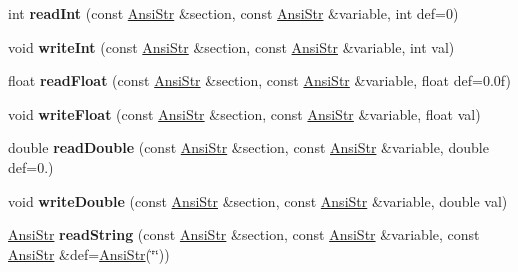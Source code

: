 \begin{DoxyCompactItemize}
\item 
\hypertarget{classps_1_1utils_1_1IniFile_a3eb09c6424b2f1d82fe7008445838fed}{}int {\bfseries read\+Int} (const \hyperlink{classps_1_1base_1_1CAString}{Ansi\+Str} \&section, const \hyperlink{classps_1_1base_1_1CAString}{Ansi\+Str} \&variable, int def=0)\label{classps_1_1utils_1_1IniFile_a3eb09c6424b2f1d82fe7008445838fed}

\item 
\hypertarget{classps_1_1utils_1_1IniFile_a0ebbcfb0c2053b526665893902dfbdc9}{}void {\bfseries write\+Int} (const \hyperlink{classps_1_1base_1_1CAString}{Ansi\+Str} \&section, const \hyperlink{classps_1_1base_1_1CAString}{Ansi\+Str} \&variable, int val)\label{classps_1_1utils_1_1IniFile_a0ebbcfb0c2053b526665893902dfbdc9}

\item 
\hypertarget{classps_1_1utils_1_1IniFile_a5d06bd9d2c705cf333fb9fc5af9f1e04}{}float {\bfseries read\+Float} (const \hyperlink{classps_1_1base_1_1CAString}{Ansi\+Str} \&section, const \hyperlink{classps_1_1base_1_1CAString}{Ansi\+Str} \&variable, float def=0.\+0f)\label{classps_1_1utils_1_1IniFile_a5d06bd9d2c705cf333fb9fc5af9f1e04}

\item 
\hypertarget{classps_1_1utils_1_1IniFile_a5eca8b88c79d70495281dde32a286eb4}{}void {\bfseries write\+Float} (const \hyperlink{classps_1_1base_1_1CAString}{Ansi\+Str} \&section, const \hyperlink{classps_1_1base_1_1CAString}{Ansi\+Str} \&variable, float val)\label{classps_1_1utils_1_1IniFile_a5eca8b88c79d70495281dde32a286eb4}

\item 
\hypertarget{classps_1_1utils_1_1IniFile_a7faa7ef48f69cab0a2c1b2b383340058}{}double {\bfseries read\+Double} (const \hyperlink{classps_1_1base_1_1CAString}{Ansi\+Str} \&section, const \hyperlink{classps_1_1base_1_1CAString}{Ansi\+Str} \&variable, double def=0.)\label{classps_1_1utils_1_1IniFile_a7faa7ef48f69cab0a2c1b2b383340058}

\item 
\hypertarget{classps_1_1utils_1_1IniFile_abedf8c9d2bf99739981a82a798cf2f20}{}void {\bfseries write\+Double} (const \hyperlink{classps_1_1base_1_1CAString}{Ansi\+Str} \&section, const \hyperlink{classps_1_1base_1_1CAString}{Ansi\+Str} \&variable, double val)\label{classps_1_1utils_1_1IniFile_abedf8c9d2bf99739981a82a798cf2f20}

\item 
\hypertarget{classps_1_1utils_1_1IniFile_a3c71ee3326d326ecaa7d4cbef0217c18}{}\hyperlink{classps_1_1base_1_1CAString}{Ansi\+Str} {\bfseries read\+String} (const \hyperlink{classps_1_1base_1_1CAString}{Ansi\+Str} \&section, const \hyperlink{classps_1_1base_1_1CAString}{Ansi\+Str} \&variable, const \hyperlink{classps_1_1base_1_1CAString}{Ansi\+Str} \&def=\hyperlink{classps_1_1base_1_1CAString}{Ansi\+Str}(\char`\"{}\char`\"{}))\label{classps_1_1utils_1_1IniFile_a3c71ee3326d326ecaa7d4cbef0217c18}


\end{DoxyCompactItemize}

